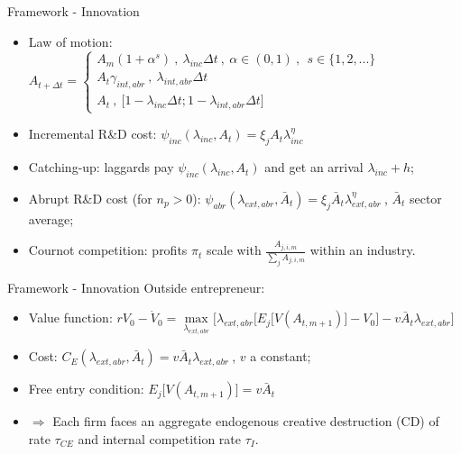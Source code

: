 \documentclass[11pt]{beamer}
\begin{document}
\begin{frame}{Framework - Innovation}
	\begin{itemize}\itemsep10pt	
	\item Law of motion: $A_{t+\Delta t} =\begin{cases}
               A_m(1+\alpha^{s})\:,\: \lambda_{inc}\Delta t \:,\: \alpha \in (0,1)\:,\:\ s \in \{1, 2, ...\}\\
               A_t\gamma_{int,abr}\:,\: \lambda_{int,abr}\Delta t\\
               A_t \:, \: \big[1 - \lambda_{inc}\Delta t; 1 - \lambda_{int,abr}\Delta t\big] 
    \end{cases}$
	\item Incremental R\&D cost: $\psi_{inc}(\lambda_{inc}, A_{t}) = \xi_j A_t \lambda_{inc}^{\eta}$
	\item Catching-up: laggards pay $\psi_{inc}(\lambda_{inc}, A_{t})$ and get an arrival $\lambda_{inc} + h$;
	\item Abrupt R\&D cost (for $n_p > 0$): $\psi_{abr}(\lambda_{ext,abr}, \bar{A}_{t}) = \xi_j \bar{A}_t \lambda_{ext,abr}^{\eta}\:$, $\bar{A}_{t}$ sector average;
	\item Cournot competition: profits $\pi_t$ scale with $\frac{A_{j,i,m}}{\sum_{j}A_{j,i,m}}$ within an industry.
	\end{itemize}
\end{frame}

\begin{frame}{Framework - Innovation}
Outside entrepreneur:
	\begin{itemize}\itemsep12pt	
	\item Value function: $rV_0 - \dot{V}_0 = \max\limits_{\lambda_{ext, abr}}\big[\lambda_{ext, abr}\big[E_j\big[V(A_{t, m+1})\big] - V_0\big] - v \bar{A}_{t}\lambda_{ext, abr}\big]$
 	\item Cost: $C_E(\lambda_{ext, abr}, \bar{A}_{t}) = v \bar{A}_{t} \lambda_{ext, abr}\:$, $v$ a constant;
	\item Free entry condition: $E_j\big[V(A_{t, m+1})\big] = v \bar{A}_{t}$
	\item $\Rightarrow$ Each firm faces an aggregate endogenous creative destruction (CD) of rate $\tau_{CE}$ and internal competition rate $\tau_I$.
	\end{itemize}
\end{frame}
\end{document}

